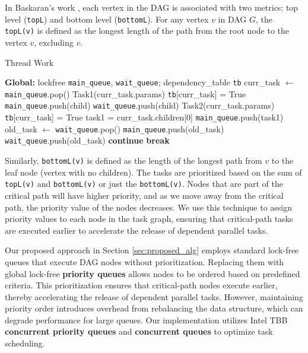 In Baskaran's work \cite{baskaran2009compiler}, each vertex in the DAG is associated with two metrics: top level (\texttt{topL}) and bottom level (\texttt{bottomL}). For any vertex \(v\) in DAG \(G\), the \texttt{topL(v)} is defined as the longest length of the path from the root node to the vertex \(v\), excluding \(v\). 
\begin{algorithm}
	\caption{Thread Work}\label{alg:thdwork}
	\begin{algorithmic}[1]
		\State \textbf{Global:} lockfree \texttt{main\_queue}, \texttt{wait\_queue}; dependency\_table \texttt{tb}
		\State curr\_task $\gets$ \texttt{main\_queue}.pop()
		\State Task1(curr\_task.params)
		\State \texttt{tb}[curr\_task] = True
		\State \texttt{main\_queue}.push(child)
		\Else
		\State \texttt{wait\_queue}.push(child)
		\EndIf
		\EndFor
		\State Task2(curr\_task.params)
		\State \texttt{tb}[curr\_task] = True
		\State task1 = curr\_task.children[0]
		\State \texttt{main\_queue}.push(task1)
		\EndIf
		\EndIf
		\EndIf
		\State old\_task $\gets$ \texttt{wait\_queue}.pop()
		\State \texttt{main\_queue}.push(old\_task)
		\Else
		\State \texttt{wait\_queue}.push(old\_task)
		\EndIf
		\EndIf
		\State \textbf{continue}
		\Else
		\State \textbf{break}
		\EndIf
		\EndWhile
	\end{algorithmic}
\end{algorithm}

Similarly, \texttt{bottomL(v)} is defined as the length of the longest path from \(v\) to the leaf node (vertex with no children). The tasks are prioritized based on the sum of \texttt{topL(v)} and \texttt{bottomL(v)} or just the \texttt{bottomL(v)}. Nodes that are part of the critical path will have higher priority, and as we move away from the critical path, the priority value of the nodes decreases. We use this technique to assign priority values to each node in the task graph, ensuring that critical-path tasks are executed earlier to accelerate the release of dependent parallel tasks.

Our proposed approach in Section \ref{sec:proposed_alg} employs standard lock-free queues that execute DAG nodes without prioritization. Replacing them with global lock-free \textbf{priority queues} allows nodes to be ordered based on predefined criteria. This prioritization ensures that critical-path nodes execute earlier, thereby accelerating the release of dependent parallel tasks. However, maintaining priority order introduces overhead from rebalancing the data structure, which can degrade performance for large queues. Our implementation utilizes Intel TBB \textbf{concurrent priority queues} and \textbf{concurrent queues} to optimize task scheduling.



